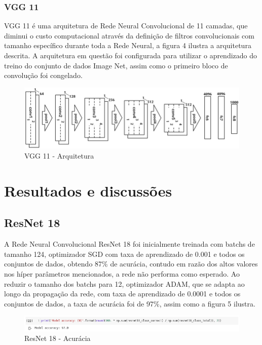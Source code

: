 \documentclass[12pt]{article}
\newcommand\tab[1][1cm]{\hspace*{#1}}
\begin{document}
\subsubsection{VGG 11}

\tab\tab[0.5pt] VGG 11  \cite{Vgg11} é uma arquitetura de Rede Neural Convolucional de 11 camadas, que diminui o custo computacional através da definição de filtros convolucionais com tamanho específico durante toda a Rede Neural, a figura 4 ilustra a arquitetura descrita. A arquitetura em questão foi configurada para utilizar o aprendizado do treino do conjunto de dados Image Net, assim como o primeiro bloco de convolução foi congelado.

\begin{figure}[ht]
\centering
\includegraphics[width=.9\textwidth]{vgg11.png}
\caption{VGG 11 - Arquitetura}
\label{fig:vgg11}
\end{figure}

\section{Resultados e discussões}

\subsection{ResNet 18}

\tab\tab[0.5pt] A Rede Neural Convolucional ResNet 18 foi inicialmente treinada com batchs de tamanho 124, optimizador SGD com taxa de aprendizado de 0.001 e todos os conjuntos de dados, obtendo 87\% de acurácia, contudo em razão dos altos valores nos híper parâmetros mencionados, a rede não performa como esperado. Ao reduzir o tamanho dos batchs para 12, optimizador ADAM, que se adapta ao longo da propagação da rede, com taxa de aprendizado de 0.0001 e todos os conjuntos de dados, a taxa de acurácia foi de 97\%, assim como a figura 5 ilustra.

\begin{figure}[ht]
\centering
\includegraphics[width=.9\textwidth]{resnet18_accuracy.png}
\caption{ResNet 18 - Acurácia}
\label{fig:resnet18accuracy}
\end{figure}
\end{document}
